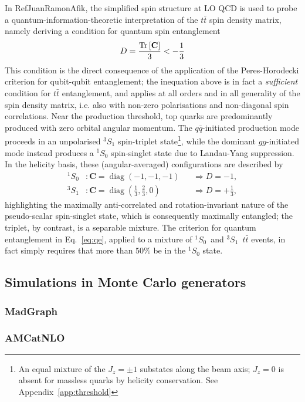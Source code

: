 \documentclass[aps,prd,twocolumn,floatfix,superscriptaddress,longbibliography,10pt]{revtex4-2}
\DeclareMathOperator{\diag}{diag}
\newcommand{\singlet}{\ensuremath{^{1}S_0}\xspace}
\newcommand{\triplet}{\ensuremath{^{3}S_1}\xspace}
\newcommand{\ttbar}{{\ensuremath{t\bar{t}}}\xspace}
\begin{document}
In RefJuanRamonAfik, the simplified spin structure at LO QCD is used to probe a quantum-information-theoretic interpretation of the \ttbar spin density matrix, namely deriving a condition for quantum spin entanglement
\begin{equation}\label{eq:qe}
  D=\dfrac{\Tr\left[\mathbf{C}\right]}{3} < -\dfrac{1}{3}
\end{equation}
This condition is the direct consequence of the application of the Peres-Horodecki criterion for qubit-qubit entanglement; the inequation above is in fact a \emph{sufficient} condition for \ttbar entanglement, and applies at all orders and in all generality of the spin density matrix, i.e. also with non-zero polarisations and non-diagonal spin correlations.
Near the production threshold, top quarks are predominantly produced with zero orbital angular momentum.
The $q\bar{q}$-initiated production mode proceeds in an unpolarised \triplet spin-triplet state\footnote{An equal mixture of the $J_z=\pm1$ substates along the beam axis; $J_z=0$ is absent for massless quarks by helicity conservation. See Appendix~\ref{app:threshold}}, while the dominant $gg$-initiated mode instead produces a \singlet spin-singlet state due to Landau-Yang suppression.
In the helicity basis, these (angular-averaged) configurations are described by
\begin{align}
  \singlet &: \mathbf{C}=\diag(-1,-1,-1)&&\Rightarrow D=-1,\\
  \triplet &: \mathbf{C}=\diag(\tfrac{1}{3},\tfrac{2}{3},0)&&\Rightarrow D=+\tfrac{1}{3},
\end{align}
highlighting the maximally anti-correlated and rotation-invariant nature of the pseudo-scalar spin-singlet state, which is consequently maximally entangled; the
triplet, by contrast, is a separable mixture.
The criterion for quantum entanglement in Eq.~\eqref{eq:qe}, applied to a mixture of \singlet~and \triplet~\ttbar events, in fact simply requires that more than $50\%$ be in the \singlet state.


\subsection{Simulations in Monte Carlo generators}
\subsubsection{MadGraph}
\subsubsection{AMCatNLO}
\end{document}
